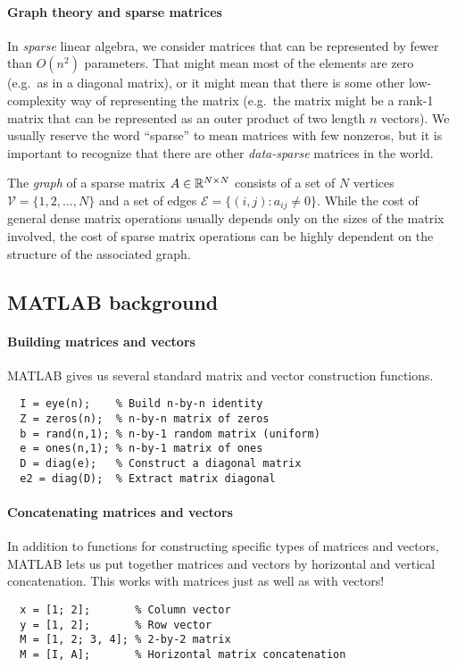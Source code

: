 \documentclass[12pt, leqno]{article}
\begin{document}
\paragraph{Graph theory and sparse matrices}
In {\em sparse} linear algebra, we consider matrices that can be
represented by fewer than $O(n^2)$ parameters.  That might mean most
of the elements are zero (e.g.~as in a diagonal matrix), or it might
mean that there is some other low-complexity way of representing the
matrix (e.g.~the matrix might be a rank-1 matrix that can be
represented as an outer product of two length $n$ vectors).  We
usually reserve the word ``sparse'' to mean matrices with few
nonzeros, but it is important to recognize that there are other
{\em data-sparse} matrices in the world.

The {\em graph} of a sparse matrix $A \in \mathbb{R}^{N \times N}$ consists
of a set of $N$ vertices $\mathcal{V} = \{1, 2, \ldots, N\}$ and a set
of edges $\mathcal{E} = \{(i,j) : a_{ij} \neq 0\}$.  While the cost of
general dense matrix operations usually depends only on the sizes of
the matrix involved, the cost of sparse matrix operations can be
highly dependent on the structure of the associated graph.

\subsection{MATLAB background}

\paragraph{Building matrices and vectors}
MATLAB gives us several standard matrix and vector construction functions.
\begin{lstlisting}
  I = eye(n);    % Build n-by-n identity
  Z = zeros(n);  % n-by-n matrix of zeros
  b = rand(n,1); % n-by-1 random matrix (uniform)
  e = ones(n,1); % n-by-1 matrix of ones
  D = diag(e);   % Construct a diagonal matrix
  e2 = diag(D);  % Extract matrix diagonal
\end{lstlisting}

\paragraph{Concatenating matrices and vectors}
In addition to functions for constructing specific types of matrices
and vectors, MATLAB lets us put together matrices and vectors by
horizontal and vertical concatenation.  This works with
matrices just as well as with vectors!
\begin{lstlisting}
  x = [1; 2];       % Column vector
  y = [1, 2];       % Row vector
  M = [1, 2; 3, 4]; % 2-by-2 matrix
  M = [I, A];       % Horizontal matrix concatenation
\end{lstlisting}
\end{document}
